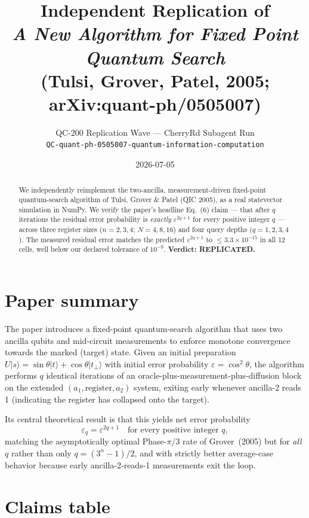 \documentclass[11pt]{article}
\title{Independent Replication of\\\emph{A New Algorithm for Fixed Point Quantum Search}\\(Tulsi, Grover, Patel, 2005; arXiv:quant-ph/0505007)}
\author{QC-200 Replication Wave --- CherryRd Subagent Run\\
\small \texttt{QC-quant-ph-0505007-quantum-information-computation}}
\date{2026-07-05}
\begin{document}
\maketitle

\begin{abstract}
We independently reimplement the two-ancilla, measurement-driven fixed-point
quantum-search algorithm of Tulsi, Grover \& Patel (QIC 2005), as a real
statevector simulation in NumPy. We verify the paper's headline Eq.~(6) claim
--- that after \(q\) iterations the residual error probability is
\emph{exactly} \(\varepsilon^{2q+1}\) for every positive integer \(q\) ---
across three register sizes (\(n=2,3,4\); \(N=4,8,16\)) and four query depths
(\(q=1,2,3,4\)). The measured residual error matches the predicted
\(\varepsilon^{2q+1}\) to \(\le 3.3\times 10^{-15}\) in all 12 cells, well below
our declared tolerance of \(10^{-9}\). \textbf{Verdict: REPLICATED.}
\end{abstract}

\section{Paper summary}

The paper introduces a fixed-point quantum-search algorithm that uses two
ancilla qubits and mid-circuit measurements to enforce monotone convergence
towards the marked (target) state. Given an initial preparation
\(U|s\rangle = \sin\theta|t\rangle + \cos\theta|t_\perp\rangle\) with initial
error probability \(\varepsilon = \cos^2\theta\), the algorithm performs \(q\)
identical iterations of an oracle-plus-measurement-plus-diffusion block on
the extended \((a_1, \text{register}, a_2)\) system, exiting early whenever
ancilla-2 reads 1 (indicating the register has collapsed onto the target).

Its central theoretical result is that this yields net error probability
\begin{equation}
\varepsilon_q = \varepsilon^{2q+1} \quad \text{for every positive integer } q,
\tag{Paper Eq.~6}\label{eq:main}
\end{equation}
matching the asymptotically optimal Phase-\(\pi/3\) rate of Grover~(2005)
but for \emph{all} \(q\) rather than only \(q=(3^n-1)/2\), and with strictly
better average-case behavior because early ancilla-2-reads-1 measurements
exit the loop.

\section{Claims table}
\end{document}
